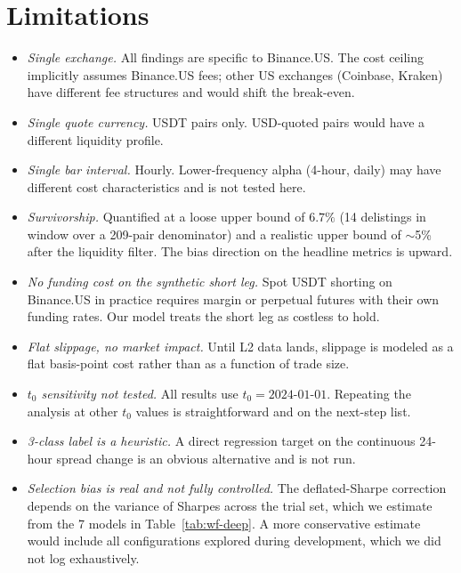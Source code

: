 \documentclass[11pt]{article}
\begin{document}
\section{Limitations} \label{sec:limits}

\begin{itemize}
    \item \emph{Single exchange.} All findings are specific to
    Binance.US. The cost ceiling implicitly assumes Binance.US fees;
    other US exchanges (Coinbase, Kraken) have different fee
    structures and would shift the break-even.

    \item \emph{Single quote currency.} USDT pairs only. USD-quoted
    pairs would have a different liquidity profile.

    \item \emph{Single bar interval.} Hourly. Lower-frequency alpha
    (4-hour, daily) may have different cost characteristics and is
    not tested here.

    \item \emph{Survivorship.} Quantified at a loose upper bound of
    $6.7\%$ (14 delistings in window over a 209-pair denominator) and
    a realistic upper bound of $\sim$5\% after the liquidity filter.
    The bias direction on the headline metrics is upward.

    \item \emph{No funding cost on the synthetic short leg.} Spot
    USDT shorting on Binance.US in practice requires margin or
    perpetual futures with their own funding rates. Our model treats
    the short leg as costless to hold.

    \item \emph{Flat slippage, no market impact.} Until L2 data
    lands, slippage is modeled as a flat basis-point cost rather
    than as a function of trade size.

    \item \emph{$t_0$ sensitivity not tested.} All results use
    $t_0 = 2024\text{-}01\text{-}01$. Repeating the analysis at other
    $t_0$ values is straightforward and on the next-step list.

    \item \emph{3-class label is a heuristic.} A direct regression
    target on the continuous 24-hour spread change is an obvious
    alternative and is not run.

    \item \emph{Selection bias is real and not fully controlled.}
    The deflated-Sharpe correction depends on the variance of Sharpes
    across the trial set, which we estimate from the 7 models in
    Table~\ref{tab:wf-deep}. A more conservative estimate would
    include all configurations explored during development, which we
    did not log exhaustively.
\end{itemize}
\end{document}
